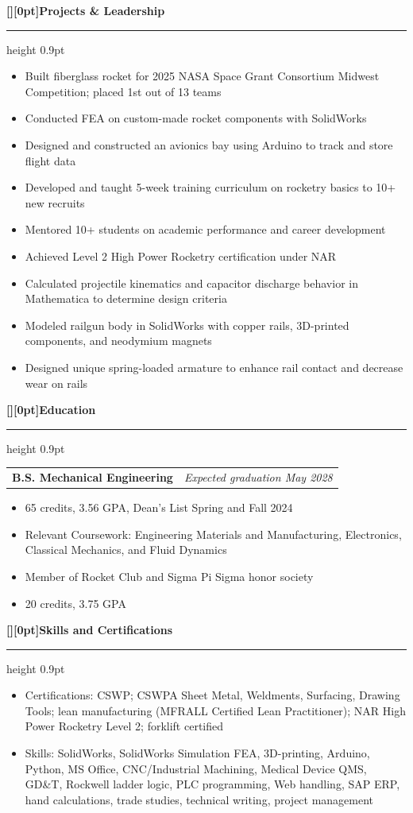 \documentclass[10pt,letterpaper]{article}
\makeatletter
\newcommand{\sectionheading}[1]{%
  \vspace{0.5em}
  {\fontsize{14}{15}\selectfont\bfseries\raisebox{0pt}[\height][0pt]{#1}}\par
  \vspace{0.4em}%
  \hrule height 0.9pt
  \vspace{0.24em}
}
\newcommand{\entrytitle}[2]{%
  \begin{tabular*}{\linewidth}{@{}l@{\extracolsep{\fill}}r@{}}
    {\fontsize{10}{12}\selectfont\bfseries #1} &
    {\fontsize{10}{12}\selectfont\itshape #2} \\
  \end{tabular*}
  \vspace{-0.13em}
}
\newcommand{\tightbullets}{%
  \begin{itemize}[
    leftmargin=1.52em,
    label=\raisebox{0.1ex}{\footnotesize\textbullet},
    itemsep=0pt,
    topsep=0pt,
    parsep=0pt,
    partopsep=0pt
  ]
}
\newcommand{\closetightbullets}{\end{itemize}\vspace{-0.03em}}
\makeatother
\begin{document}
\sectionheading{Projects \& Leadership}

\tightbullets
  \item Built fiberglass rocket for 2025 NASA Space Grant Consortium Midwest Competition; placed 1st out of 13 teams
  \item Conducted FEA on custom-made rocket components with SolidWorks
  \item Designed and constructed an avionics bay using Arduino to track and store flight data
  \item Developed and taught 5-week training curriculum on rocketry basics to 10+ new recruits
  \item Mentored 10+ students on academic performance and career development
  \item Achieved Level 2 High Power Rocketry certification under NAR
\closetightbullets

\tightbullets
  \item Calculated projectile kinematics and capacitor discharge behavior in Mathematica to determine design criteria
  \item Modeled railgun body in SolidWorks with copper rails, 3D-printed components, and neodymium magnets
  \item Designed unique spring-loaded armature to enhance rail contact and decrease wear on rails
\closetightbullets

\sectionheading{Education}

\entrytitle{B.S. Mechanical Engineering}{Expected graduation May 2028}
\tightbullets
  \item 65 credits, 3.56 GPA, Dean's List Spring and Fall 2024
  \item Relevant Coursework: Engineering Materials and Manufacturing, Electronics, Classical Mechanics, and Fluid Dynamics
  \item Member of Rocket Club and Sigma Pi Sigma honor society
\closetightbullets

\tightbullets
  \item 20 credits, 3.75 GPA
\closetightbullets

\sectionheading{Skills and Certifications}
\tightbullets
  \item Certifications: CSWP; CSWPA Sheet Metal, Weldments, Surfacing, Drawing Tools; lean manufacturing (MFRALL Certified Lean Practitioner); NAR High Power Rocketry Level 2; forklift certified
  \item Skills: SolidWorks, SolidWorks Simulation FEA, 3D-printing, Arduino, Python, MS Office, CNC/Industrial Machining, Medical Device QMS, GD\&T, Rockwell ladder logic, PLC programming, Web handling, SAP ERP, hand calculations, trade studies, technical writing, project management
\closetightbullets
\end{document}
